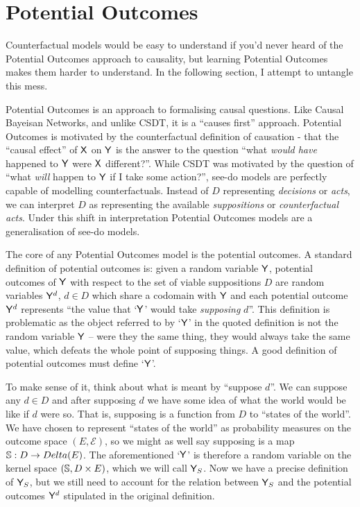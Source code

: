 


\section{Potential Outcomes}

Counterfactual models would be easy to understand if you'd never heard of the Potential Outcomes approach to causality, but learning Potential Outcomes makes them harder to understand. In the following section, I attempt to untangle this mess.

Potential Outcomes is an approach to formalising causal questions. Like Causal Bayeisan Networks, and unlike CSDT, it is a ``causes first'' approach. Potential Outcomes is motivated by the counterfactual definition of causation - that the ``causal effect'' of $\mathsf{X}$ on $\mathsf{Y}$ is the answer to the question ``what \emph{would have} happened to $\mathsf{Y}$ were $\mathsf{X}$ different?''. While CSDT was motivated by the question of ``what \emph{will} happen to $\mathsf{Y}$ if I take some action?'', see-do models are perfectly capable of modelling counterfactuals. Instead of $D$ representing \emph{decisions} or \emph{acts}, we can interpret $D$ as representing the available \emph{suppositions} or \emph{counterfactual acts}. Under this shift in interpretation Potential Outcomes models are a generalisation of see-do models.

The core of any Potential Outcomes model is the potential outcomes. A standard definition of potential outcomes is: given a random variable $\mathsf{Y}$, potential outcomes of $\mathsf{Y}$ with respect to the set of viable suppositions $D$ are random variables $\mathsf{Y}^d$, $d\in D$ which share a codomain with $\mathsf{Y}$ and each potential outcome $\mathsf{Y}^d$ represents ``the value that `$\mathsf{Y}$' would take \emph{supposing} $d$''. This definition is problematic as the object referred to by `$\mathsf{Y}$' in the quoted definition is not the random variable $\mathsf{Y}$ -- were they the same thing, they would always take the same value, which defeats the whole point of supposing things. A good definition of potential outcomes must define `$\mathsf{Y}$'.

To make sense of it, think about what is meant by ``suppose $d$''. We can suppose any $d\in D$ and after supposing $d$ we have some idea of what the world would be like if $d$ were so. That is, supposing is a function from $D$ to ``states of the world''. We have chosen to represent ``states of the world'' as probability measures on the outcome space $(E,\mathcal{E})$, so we might as well say supposing is a map $\mathbb{S}:D \to Delta(E)$. The aforementioned `$\mathsf{Y}$' is therefore a random variable on the kernel space $(\mathbb{S},D\times E)$, which we will call $\mathsf{Y}_S$. Now we have a precise definition of $\mathsf{Y}_S$, but we still need to account for the relation between $\mathsf{Y}_S$ and the potential outcomes $\mathsf{Y}^d$ stipulated in the original definition.

